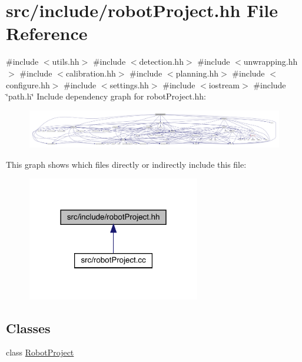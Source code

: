 \hypertarget{robot_project_8hh}{}\section{src/include/robot\+Project.hh File Reference}
\label{robot_project_8hh}
{\ttfamily \#include $<$utils.\+hh$>$}\newline
{\ttfamily \#include $<$detection.\+hh$>$}\newline
{\ttfamily \#include $<$unwrapping.\+hh$>$}\newline
{\ttfamily \#include $<$calibration.\+hh$>$}\newline
{\ttfamily \#include $<$planning.\+hh$>$}\newline
{\ttfamily \#include $<$configure.\+hh$>$}\newline
{\ttfamily \#include $<$settings.\+hh$>$}\newline
{\ttfamily \#include $<$iostream$>$}\newline
{\ttfamily \#include \char`\"{}path.\+h\char`\"{}}\newline
Include dependency graph for robot\+Project.\+hh\+:
\nopagebreak
\begin{figure}[H]
\begin{center}
\leavevmode
\includegraphics[width=350pt]{robot_project_8hh__incl}
\end{center}
\end{figure}
This graph shows which files directly or indirectly include this file\+:
\nopagebreak
\begin{figure}[H]
\begin{center}
\leavevmode
\includegraphics[width=214pt]{robot_project_8hh__dep__incl}
\end{center}
\end{figure}
\subsection*{Classes}
\begin{DoxyCompactItemize}
\item 
class \mbox{\hyperlink{class_robot_project}{Robot\+Project}}
\end{DoxyCompactItemize}
